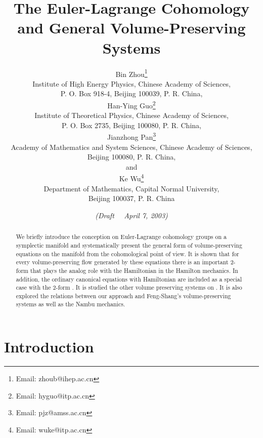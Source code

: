 \documentclass[12pt,a4paper]{article}
\title{\bf The Euler-Lagrange Cohomology\\
  and General Volume-Preserving Systems}
\author{Bin Zhou\thanks{Email: zhoub@ihep.ac.cn}\\
  \small{Institute of High Energy Physics,
  Chinese Academy of Sciences,} \\
  \small{P. O. Box 918-4, Beijing 100039, P. R. China,}\\
  Han-Ying Guo\thanks{Email: hyguo@itp.ac.cn}\\
  \small{Institute of Theoretical Physics,
  Chinese Academy of Sciences,} \\
  \small{P. O. Box 2735, Beijing 100080, P. R. China,}\\
  Jianzhong Pan\thanks{Email: pjz@amss.ac.cn}\\
  \small{Academy of Mathematics and System Sciences, Chinese Academy of Sciences,} \\
  \small{Beijing 100080, P. R. China,}\\
  and\\
  Ke Wu\thanks{Email: wuke@itp.ac.cn}\\
  \small{Department of Mathematics, Capital Normal University,} \\
  \small{Beijing 100037, P. R. China}}
\date{\small\it (Draft ~~April 7, 2003)}
\begin{document}
\maketitle

\begin{abstract}
We briefly introduce the conception on Euler-Lagrange cohomology
groups on a symplectic manifold \coordHE{} and
systematically present the general form of volume-preserving
equations on the manifold from the cohomological point of view. It
is shown that for every volume-preserving flow generated by these
equations there is an important 2-form that plays the analog role
with the Hamiltonian in the Hamilton mechanics. In addition, the
ordinary canonical equations with Hamiltonian \coordHE{} are included as
a special case with the 2-form \coordHE{}. It is
studied the other volume preserving systems on \coordHE{}. It is also explored the relations between our approach
and Feng-Shang's volume-preserving systems as well as the Nambu
mechanics.



\end{abstract}
\newpage
\tableofcontents

\newpage
\section{Introduction}
\label{sect:Intro}
\end{document}
